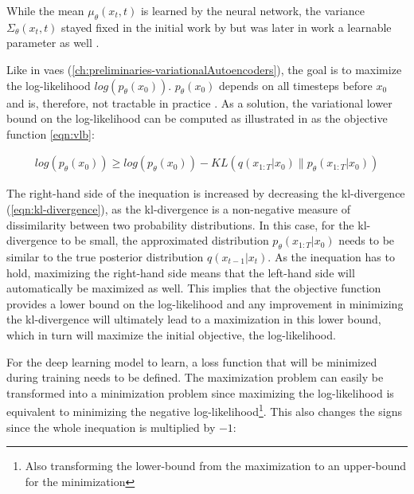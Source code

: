 While the mean $\mu_{\theta}(x_t, t)$ is learned by the neural network, the variance $\Sigma_{\theta}(x_t, t)$ stayed fixed in the initial work by \cite{ho2020DenoisingDiffusionProbabilistic} 
but was later in \textcite{nichol2021ImprovedDenoisingDiffusion} work a learnable parameter as well \cite{zbinden2022ImplementingExperimentingDiffusion}.

Like in \glspl{vae} (\autoref{ch:preliminaries-variationalAutoencoders}), the goal is to maximize the log-likelihood $log(p_\theta(x_0))$.
$p_\theta(x_0)$ depends on all timesteps before $x_0$ and is, therefore, not tractable in practice \cite{zbinden2022ImplementingExperimentingDiffusion}.
As a solution, the variational lower bound on the log-likelihood can be computed as illustrated in as the objective function \autoref{eqn:vlb}: %

\begin{equation}
  \label{eqn:vlb}
  \begin{align*}
    log(p_\theta(x_0)) \geq log(p_\theta(x_0)) - KL(q(x_{1:T}|x_0) \parallel p_\theta(x_{1:T}|x_0))
  \end{align*}
\end{equation}

The right-hand side of the inequation is increased by decreasing the \gls{kl}-divergence (\autoref{eqn:kl-divergence}), as the \gls{kl}-divergence is a non-negative measure of dissimilarity between two probability distributions. 
In this case, for the \gls{kl}-divergence to be small, the approximated distribution $p_\theta(x_{1:T}|x_0)$ needs to be similar to the true posterior distribution $q(x_{t-1}|x_t)$.
As the inequation has to hold, maximizing the right-hand side means that the left-hand side will automatically be maximized as well.
This implies that the objective function provides a lower bound on the log-likelihood and any improvement in minimizing the \gls{kl}-divergence will ultimately lead to a maximization in this lower bound, which in turn will maximize the initial objective, the log-likelihood.

For the deep learning model to learn, a loss function that will be minimized during training needs to be defined.
The maximization problem can easily be transformed into a minimization problem since maximizing the log-likelihood is equivalent to minimizing the negative log-likelihood\footnote{Also transforming the lower-bound from the maximization to an upper-bound for the minimization}.
This also changes the signs since the whole inequation is multiplied by $-1$:

